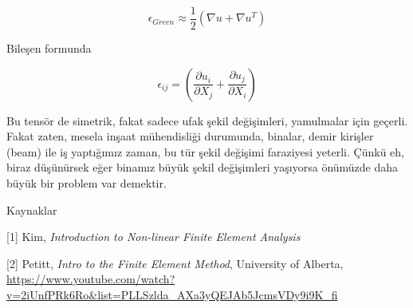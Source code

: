 \documentclass[12pt,fleqn]{article}\usepackage{../../common}
\begin{document}
$$
\epsilon_{Green} \approx \frac{1}{2} (\nabla u + \nabla u^T )
$$

Bileşen formunda

$$
\epsilon_{ij} = \left(
\frac{\partial u_i}{\partial X_j} + \frac{\partial u_j}{\partial X_i}
\right)
$$

Bu tensör de simetrik, fakat sadece ufak şekil değişimleri, yamulmalar için
geçerli. Fakat zaten, mesela inşaat mühendisliği durumunda, binalar, demir
kirişler (beam) ile iş yaptığımız zaman, bu tür şekil değişimi faraziyesi
yeterli. Çünkü eh, biraz düşünürsek eğer binamız büyük şekil değişimleri
yaşıyorsa önümüzde daha büyük bir problem var demektir.

Kaynaklar

[1] Kim, {\em Introduction to Non-linear Finite Element Analysis}

[2] Petitt, {\em Intro to the Finite Element Method}, University of Alberta,
    \url{https://www.youtube.com/watch?v=2iUnfPRk6Ro&list=PLLSzlda_AXa3yQEJAb5JcmsVDy9i9K_fi}
\end{document}
